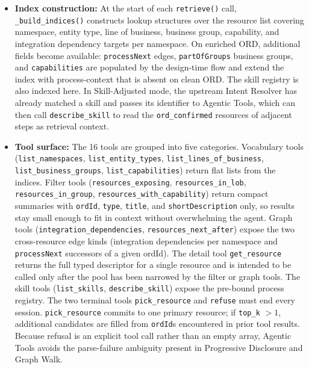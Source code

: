 \begin{itemize}
  \item \textbf{Index construction:} At the start of each \texttt{retrieve()} call, \texttt{\_build\_indices()} constructs lookup structures over the resource list covering namespace, entity type, line of business, business group, capability, and integration dependency targets per namespace. On enriched ORD, additional fields become available: \texttt{processNext} edges, \texttt{partOfGroups} business groups, and \texttt{capabilities} are populated by the design-time flow and extend the index with process-context that is absent on clean ORD. The skill registry is also indexed here. In Skill-Adjusted mode, the upstream Intent Resolver has already matched a skill and passes its identifier to Agentic Tools, which can then call \texttt{describe\_skill} to read the \texttt{ord\_confirmed} resources of adjacent steps as retrieval context.

  \item \textbf{Tool surface:} The 16 tools are grouped into five categories. Vocabulary tools (\texttt{list\_namespaces}, \texttt{list\_entity\_types}, \texttt{list\_lines\_of\_business}, \texttt{list\_business\_groups}, \texttt{list\_capabilities}) return flat lists from the indices. Filter tools (\texttt{resources\_exposing}, \texttt{resources\_in\_lob}, \texttt{resources\_in\_group}, \texttt{resources\_with\_capability}) return compact summaries with \texttt{ordId}, \texttt{type}, \texttt{title}, and \texttt{shortDescription} only, so results stay small enough to fit in context without overwhelming the agent. Graph tools (\texttt{integration\_dependencies}, \texttt{resources\_next\_after}) expose the two cross-resource edge kinds (integration dependencies per namespace and \texttt{processNext} successors of a given ordId). The detail tool \texttt{get\_resource} returns the full typed descriptor for a single resource and is intended to be called only after the pool has been narrowed by the filter or graph tools. The skill tools (\texttt{list\_skills}, \texttt{describe\_skill}) expose the pre-bound process registry. The two terminal tools \texttt{pick\_resource} and \texttt{refuse} must end every session. \texttt{pick\_resource} commits to one primary resource; if \texttt{top\_k} $> 1$, additional candidates are filled from \texttt{ordId}s encountered in prior tool results. Because refusal is an explicit tool call rather than an empty array, Agentic Tools avoids the parse-failure ambiguity present in Progressive Disclosure and Graph Walk.


\end{itemize}

